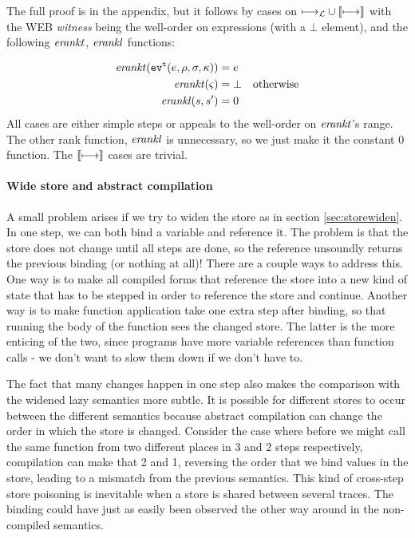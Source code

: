 \documentclass[preprint,onecolumn,9pt]{sigplanconf} %
\begin{document}
The full proof is in the appendix, but it follows by cases on
$\lmachstep \cup \cmachstep$ with the WEB \emph{witness} being the
well-order on expressions (with a $\bot$ element), and the following
$\erankt$, $\erankl$ functions:

\begin{align*}
\erankt(\ev[^\mcntr]{\mexp,\menv,\msto,\mkont}) &= \mexp \\
\erankt(\mstate) &= \bot \quad \text{otherwise} \\
\erankl(s,s') &= 0
\end{align*}
All cases are either simple steps or appeals to the well-order on $\erankt$'s range. The other rank function,
$\erankl$ is unnecessary, so we just make it the constant 0
function. The $\cmachstep$ cases are trivial.

\paragraph{Wide store and abstract compilation}
A small problem arises if we try to widen the store as in section
\ref{sec:storewiden}. In one step, we can both bind a variable and
reference it. The problem is that the store does not change until all
steps are done, so the reference unsoundly returns the previous
binding (or nothing at all)! There are a couple ways to address
this. One way is to make all compiled forms that reference the store
into a new kind of state that has to be stepped in order to reference
the store and continue. Another way is to make function application
take one extra step after binding, so that running the body of the
function sees the changed store. The latter is the more enticing of
the two, since programs have more variable references than function
calls - we don't want to slow them down if we don't have to.

The fact that many changes happen in one step also makes the
comparison with the widened lazy semantics more subtle. It is possible
for different stores to occur between the different semantics because
abstract compilation can change the order in which the store is
changed. Consider the case where before we might call the same
function from two different places in 3 and 2 steps respectively,
compilation can make that 2 and 1, reversing the order that we bind
values in the store, leading to a mismatch from the previous
semantics. This kind of cross-step store poisoning is inevitable when a
store is shared between several traces. The binding could have just as
easily been observed the other way around in the non-compiled
semantics.
\end{document}
